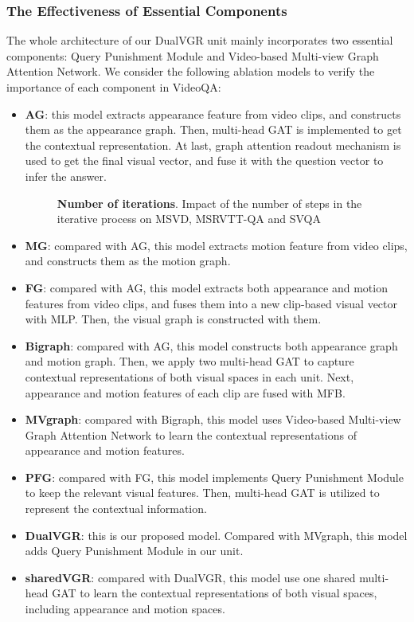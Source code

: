 \documentclass[journal]{IEEEtran}
\begin{document}
\subsubsection{The Effectiveness of Essential Components}
The whole architecture of our DualVGR unit mainly incorporates two essential components: Query Punishment Module and Video-based Multi-view Graph Attention Network. We consider the following ablation models to verify the importance of each component in VideoQA:
\begin{itemize}
    \item \textbf{AG}: this model extracts appearance feature from video clips, and constructs them as the appearance graph. Then, multi-head GAT is implemented to get the contextual representation. At last, graph attention readout mechanism is used to get the final visual vector, and fuse it with the question vector to infer the answer.
    \begin{figure*}[t]
    \centering
    
    \caption{\textbf{Number of iterations}. Impact of the number of steps in the iterative process on MSVD, MSRVTT-QA and SVQA}
    \label{fig:iteration}
\end{figure*}
    \item \textbf{MG}: compared with AG, this model extracts motion feature from video clips, and constructs them as the motion graph.
    \item \textbf{FG}: compared with AG, this model extracts both appearance and motion features from video clips, and fuses them into a new clip-based visual vector with MLP. Then, the visual graph is constructed with them. 
    \item \textbf{Bigraph}: compared with AG, this model constructs both appearance graph and motion graph. Then, we apply two multi-head GAT to capture contextual representations of both visual spaces in each unit. Next, appearance and motion features of each clip are fused with MFB.
    \item \textbf{MVgraph}: compared with Bigraph, this model uses Video-based Multi-view Graph Attention Network to learn the contextual representations of appearance and motion features.
    \item \textbf{PFG}: compared with FG, this model implements Query Punishment Module to keep the relevant visual features. Then, multi-head GAT is utilized to represent the contextual information.
    \item \textbf{DualVGR}: this is our proposed model. Compared with MVgraph, this model adds Query Punishment Module in our unit.
    \item \textbf{sharedVGR}: compared with DualVGR, this model use one shared multi-head GAT to learn the contextual representations of both visual spaces, including appearance and motion spaces.
\end{itemize}
\end{document}
